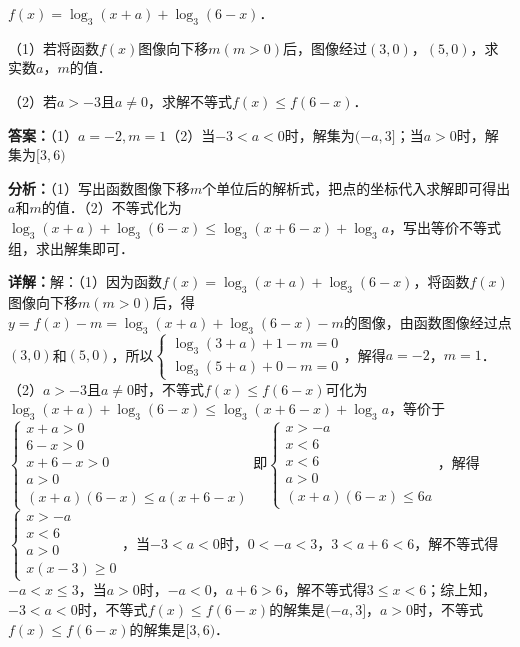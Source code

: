 \begin{question}[points=14]
$f(x)=\log_3(x+a)+\log_3(6-x)$．

（1）若将函数$f(x)$图像向下移$m(m>0)$后，图像经过$(3,0)$，$(5,0)$，求实数$a$，$m$的值．

（2）若$a>-3$且$a\neq0$，求解不等式$f(x)\leq f(6-x)$．
\begin{solution}
\textbf{答案：}（1）$a=-2,m=1$（2）当$-3<a<0$时，解集为$(-a,3]$；当$a>0$时，解集为$[3,6)$

\textbf{分析：}（1）写出函数图像下移$m$个单位后的解析式，把点的坐标代入求解即可得出$a$和$m$的值．（2）不等式化为$\log_3(x+a)+\log_3(6-x)\leq \log_3(x+6-x)+\log_3 a$，写出等价不等式组，求出解集即可．

\textbf{详解：}解：（1）因为函数$f(x)=\log_3(x+a)+\log_3(6-x)$，将函数$f(x)$图像向下移$m(m>0)$后，得$y=f(x)-m=\log_3(x+a)+\log_3(6-x)-m$的图像，由函数图像经过点$(3,0)$和$(5,0)$，所以$\begin{cases}\log_3(3+a)+1-m=0\\\log_3(5+a)+0-m=0\end{cases}$，解得$a=-2$，$m=1$．（2）$a>-3$且$a\neq0$时，不等式$f(x)\leq f(6-x)$可化为$\log_3(x+a)+\log_3(6-x)\leq \log_3(x+6-x)+\log_3 a$，等价于$\begin{cases}x+a>0\\6-x>0\\x+6-x>0\\a>0\\(x+a)(6-x)\leq a(x+6-x)\end{cases}$即$\begin{cases}x>-a\\x<6\\x<6\\a>0\\(x+a)(6-x)\leq 6a\end{cases}$，解得$\begin{cases}x>-a\\x<6\\a>0\\x(x-3)\geq0\end{cases}$，当$-3<a<0$时，$0<-a<3$，$3<a+6<6$，解不等式得$-a<x\leq 3$，当$a>0$时，$-a<0$，$a+6>6$，解不等式得$3\leq x<6$；综上知，$-3<a<0$时，不等式$f(x)\leq f(6-x)$的解集是$(-a,3]$，$a>0$时，不等式$f(x)\leq f(6-x)$的解集是$[3,6)$．
\end{solution}
\end{question}

